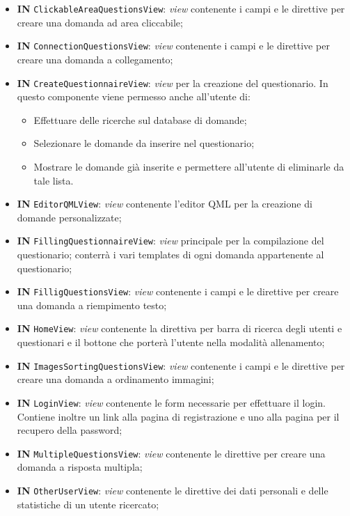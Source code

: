 \begin{itemize}
\begin{itemize}
			\item \textbf{IN} \texttt{ClickableAreaQuestionsView}: \textit{view} contenente i campi e le direttive per creare una domanda ad area cliccabile;
			\item \textbf{IN} \texttt{ConnectionQuestionsView}: \textit{view} contenente i campi e le direttive per creare una domanda a collegamento;
			\item \textbf{IN} \texttt{CreateQuestionnaireView}: \textit{view} per la creazione del questionario. In questo componente viene permesso anche all'utente di:
			\begin{itemize}
				\item Effettuare delle ricerche sul database di domande;
				\item Selezionare le domande da inserire nel questionario;
				\item Mostrare le domande già inserite e permettere all'utente di eliminarle da tale lista.
			\end{itemize}
			\item \textbf{IN} \texttt{EditorQMLView}: \textit{view} contenente l'editor QML per la creazione di domande personalizzate;
			\item \textbf{IN} \texttt{FillingQuestionnaireView}: \textit{view} principale per la compilazione del questionario; conterrà i vari templates di ogni domanda appartenente al questionario;
			\item \textbf{IN} \texttt{FilligQuestionsView}: \textit{view} contenente i campi e le direttive per creare una domanda a riempimento testo;
			\item \textbf{IN} \texttt{HomeView}: \textit{view} contenente la direttiva per barra di ricerca degli utenti e questionari e il bottone che porterà l'utente nella modalità allenamento;
			\item \textbf{IN} \texttt{ImagesSortingQuestionsView}: \textit{view} contenente i campi e le direttive per creare una domanda a ordinamento immagini;
			\item \textbf{IN} \texttt{LoginView}: \textit{view} contenente le form necessarie per effettuare il login. Contiene inoltre un link alla pagina di registrazione e uno alla pagina per il recupero della password;
			\item \textbf{IN} \texttt{MultipleQuestionsView}: \textit{view} contenente le direttive per creare una domanda a risposta multipla;
			\item \textbf{IN} \texttt{OtherUserView}: \textit{view} contenente le direttive dei dati personali e delle statistiche di un utente ricercato;

\end{itemize}
\end{itemize}
